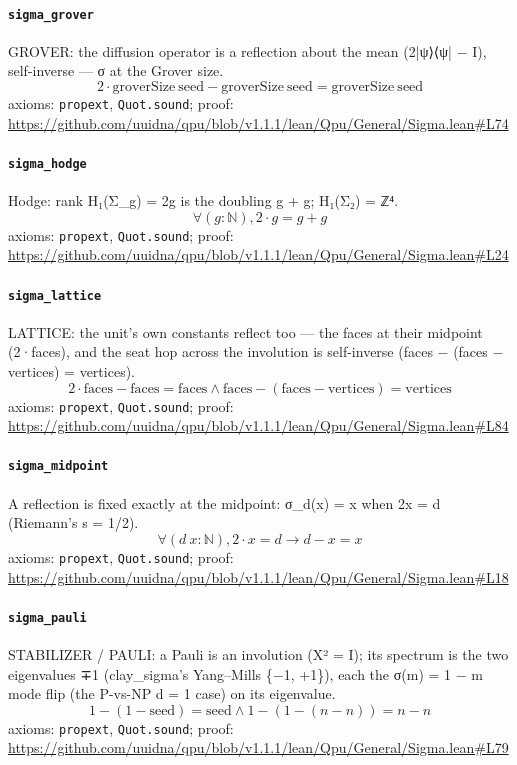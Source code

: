 \documentclass[11pt]{article}
\begin{document}
\paragraph{\texttt{sigma\_grover}}
GROVER: the diffusion operator is a reflection about the mean (2|ψ⟩⟨ψ| − I), self-inverse — σ at the Grover size.
\[ 2 \cdot \mathrm{groverSize}\ \mathrm{seed} - \mathrm{groverSize}\ \mathrm{seed} = \mathrm{groverSize}\ \mathrm{seed} \]
\noindent axioms: \texttt{propext}, \texttt{Quot.sound}; proof: \url{https://github.com/uuidna/qpu/blob/v1.1.1/lean/Qpu/General/Sigma.lean\#L74}

\paragraph{\texttt{sigma\_hodge}}
Hodge: rank H₁(Σ\_g) = 2g is the doubling g + g; H₁(Σ₂) = ℤ⁴.
\[ \forall (g : \mathbb{N}), 2 \cdot g = g + g \]
\noindent axioms: \texttt{propext}, \texttt{Quot.sound}; proof: \url{https://github.com/uuidna/qpu/blob/v1.1.1/lean/Qpu/General/Sigma.lean\#L24}

\paragraph{\texttt{sigma\_lattice}}
LATTICE: the unit's own constants reflect too — the faces at their midpoint (2·faces), and the seat hop across the involution is self-inverse (faces − (faces − vertices) = vertices).
\[ 2 \cdot \mathrm{faces} - \mathrm{faces} = \mathrm{faces} \land \mathrm{faces} - (\mathrm{faces} - \mathrm{vertices}) = \mathrm{vertices} \]
\noindent axioms: \texttt{propext}, \texttt{Quot.sound}; proof: \url{https://github.com/uuidna/qpu/blob/v1.1.1/lean/Qpu/General/Sigma.lean\#L84}

\paragraph{\texttt{sigma\_midpoint}}
A reflection is fixed exactly at the midpoint: σ\_d(x) = x when 2x = d (Riemann's s = 1/2).
\[ \forall (d\ x : \mathbb{N}), 2 \cdot x = d \to d - x = x \]
\noindent axioms: \texttt{propext}, \texttt{Quot.sound}; proof: \url{https://github.com/uuidna/qpu/blob/v1.1.1/lean/Qpu/General/Sigma.lean\#L18}

\paragraph{\texttt{sigma\_pauli}}
STABILIZER / PAULI: a Pauli is an involution (X² = I); its spectrum is the two eigenvalues ∓1 (clay\_sigma's Yang–Mills \{−1, +1\}), each the σ(m) = 1 − m mode flip (the P-vs-NP d = 1 case) on its eigenvalue.
\[ 1 - (1 - \mathrm{seed}) = \mathrm{seed} \land 1 - (1 - (n - n)) = n - n \]
\noindent axioms: \texttt{propext}, \texttt{Quot.sound}; proof: \url{https://github.com/uuidna/qpu/blob/v1.1.1/lean/Qpu/General/Sigma.lean\#L79}
\end{document}

